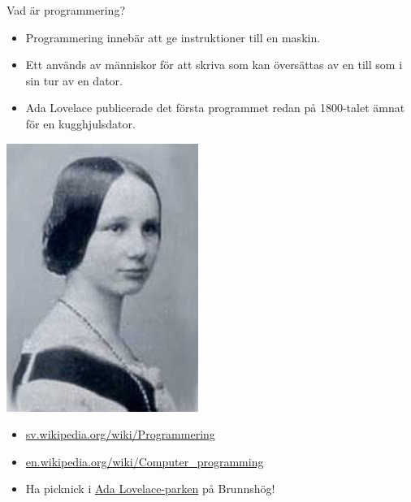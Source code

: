 \begin{Slide}{Vad är programmering?}
\begin{itemize}
\item Programmering innebär att ge instruktioner till en maskin.
\item Ett  används av människor för att skriva  som kan översättas av en  till  som i sin tur  av en dator.
\end{itemize}


\begin{minipage}{.8\textwidth}
\begin{itemize}
\item Ada Lovelace publicerade det första programmet redan på 1800-talet ämnat för en kugghjulsdator.
\end{itemize}
\end{minipage}%
\begin{minipage}{.2\textwidth}
\centering\includegraphics[width=0.6\columnwidth]{../img/ada}
\end{minipage}%
\begin{itemize}
\item \href{https://sv.wikipedia.org/wiki/Programmering}{sv.wikipedia.org/wiki/Programmering}
\item \href{https://en.wikipedia.org/wiki/Computer\_programming}{en.wikipedia.org/wiki/Computer\_programming}
\item Ha picknick i \href{http://kartor.lund.se/wiki/lundanamn/index.php/Ada_Lovelace-parken}{Ada Lovelace-parken} på Brunnshög!
\end{itemize}
\end{Slide}



